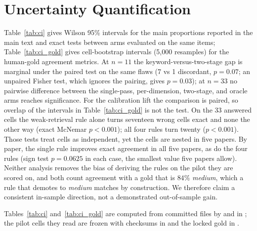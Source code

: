 \section{Uncertainty Quantification}
\label{app:ci}
Table~\ref{tab:ci} gives Wilson 95\% intervals for the main proportions reported in
the main text and exact tests between arms evaluated on the same items;
Table~\ref{tab:ci_gold} gives cell-bootstrap intervals (5,000 resamples) for
the human-gold agreement metrics. At $n{=}11$ the keyword-versus-two-stage gap
is marginal under the paired test on the same flaws (7 vs 1 discordant,
$p{=}0.07$; an unpaired Fisher test, which ignores the pairing, gives
$p{=}0.03$); at $n{=}33$ no
pairwise difference between the single-pass, per-dimension, two-stage, and
oracle arms reaches significance. For the calibration lift the comparison is paired, so overlap of the
intervals in Table~\ref{tab:ci_gold} is not the test. On the 33 answered cells
the weak-retrieval rule alone turns seventeen wrong cells exact and none the
other way (exact McNemar $p{<}0.001$); all four rules turn twenty
($p{<}0.001$). Those tests treat cells as independent, yet the cells are nested
in five papers. By paper, the single rule improves exact agreement in all five
papers, as do the four rules (sign test $p{=}0.0625$ in each case, the smallest
value five papers allow). Neither analysis removes the bias of deriving the
rules on the pilot they are scored on, and both count agreement with a gold
that is $84\%$ \emph{medium}, which a rule that demotes to \emph{medium} matches
by construction. We therefore claim a consistent in-sample direction, not a
demonstrated out-of-sample gain.

\begin{sloppypar}\noindent Tables~\ref{tab:ci} and~\ref{tab:ci_gold} are
computed from committed files by  and
 in ; the pilot cells
they read are frozen with checksums in
 and the locked gold in
.\end{sloppypar}

